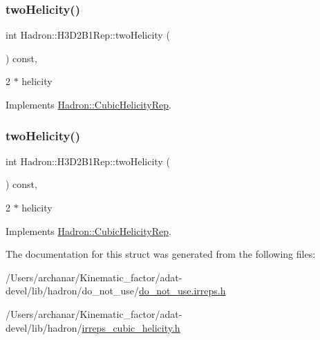 \subsubsection{\texorpdfstring{twoHelicity()}{twoHelicity()}\hspace{0.1cm}{\footnotesize\ttfamily [2/3]}}
{\footnotesize\ttfamily int Hadron\+::\+H3\+D2\+B1\+Rep\+::two\+Helicity (\begin{DoxyParamCaption}{ }\end{DoxyParamCaption}) const\hspace{0.3cm}{\ttfamily [inline]}, {\ttfamily [virtual]}}

2 $\ast$ helicity 

Implements \mbox{\hyperlink{structHadron_1_1CubicHelicityRep_af507aa56fc2747eacc8cb6c96db31ecc}{Hadron\+::\+Cubic\+Helicity\+Rep}}.

\mbox{\label{structHadron_1_1H3D2B1Rep_aac44e59a958d39120aa886dafe262b7d}} 
\subsubsection{\texorpdfstring{twoHelicity()}{twoHelicity()}\hspace{0.1cm}{\footnotesize\ttfamily [3/3]}}
{\footnotesize\ttfamily int Hadron\+::\+H3\+D2\+B1\+Rep\+::two\+Helicity (\begin{DoxyParamCaption}{ }\end{DoxyParamCaption}) const\hspace{0.3cm}{\ttfamily [inline]}, {\ttfamily [virtual]}}

2 $\ast$ helicity 

Implements \mbox{\hyperlink{structHadron_1_1CubicHelicityRep_af507aa56fc2747eacc8cb6c96db31ecc}{Hadron\+::\+Cubic\+Helicity\+Rep}}.



The documentation for this struct was generated from the following files\+:\begin{DoxyCompactItemize}
\item 
/\+Users/archanar/\+Kinematic\+\_\+factor/adat-\/devel/lib/hadron/do\+\_\+not\+\_\+use/\mbox{\hyperlink{adat-devel_2lib_2hadron_2do__not__use_2do__not__use_8irreps_8h}{do\+\_\+not\+\_\+use.\+irreps.\+h}}\item 
/\+Users/archanar/\+Kinematic\+\_\+factor/adat-\/devel/lib/hadron/\mbox{\hyperlink{adat-devel_2lib_2hadron_2irreps__cubic__helicity_8h}{irreps\+\_\+cubic\+\_\+helicity.\+h}}\end{DoxyCompactItemize}
